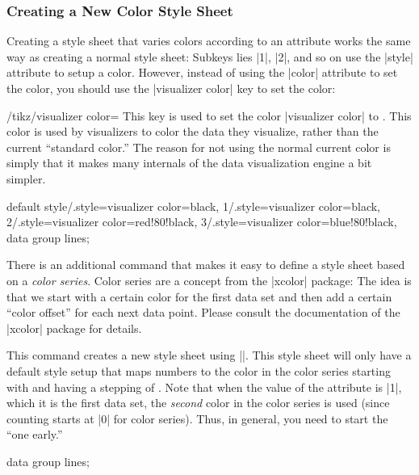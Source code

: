\subsubsection{Creating a New Color Style Sheet}

Creating a style sheet that varies colors according to an attribute
works the same way as creating a normal style sheet: Subkeys lies |1|,
|2|, and so on use the |style| attribute to setup a color. However,
instead of using the |color| attribute to set the color, you should
use the |visualizer color| key to set the color:

\begin{key}{/tikz/visualizer color=}
  This key is used to set the color |visualizer color| to
  . This color is used by visualizers to color the data
  they visualize, rather than the current ``standard color.'' The
  reason for not using the normal current color is simply that it
  makes many internals of the data visualization engine a bit
  simpler. 
\begin{codeexample}[]
{
  default style/.style={visualizer color=black},
  1/.style={visualizer color=black},
  2/.style={visualizer color=red!80!black},
  3/.style={visualizer color=blue!80!black},
}
\tikz \datavisualization [
  school book axes,
  visualize as line=normal,
  visualize as line=heated,
  visualize as line=critical,
  style sheet=my colors]
data group {lines};
\end{codeexample}
\end{key}

There is an additional command that makes it easy to define a style
sheet based on a \emph{color series}. Color series are a concept from
the |xcolor| package: The idea is that we start with a certain color
for the first data set and then add a certain ``color offset'' for
each next data point. Please consult the documentation of the |xcolor|
package for details.

\begin{command}{\tikzdvdeclarestylesheetcolorseries{}}
  This command creates a new style sheet using
  |\pgfdvdeclarestylesheet|. This style sheet will only have a default
  style setup that maps numbers to the color in the color series
  starting with  and having a stepping of
  . Note that when the value of the attribute is |1|, which
  it is the first data set, the \emph{second} color in the color
  series is used (since counting starts at |0| for color
  series). Thus, in general, you need to start the  ``one early.''
\begin{codeexample}[]
\tikz \datavisualization [
  school book axes,
  visualize as line=normal,
  visualize as line=heated,
  visualize as line=critical,
  style sheet=greens]
data group {lines};
\end{codeexample}

\end{command}


